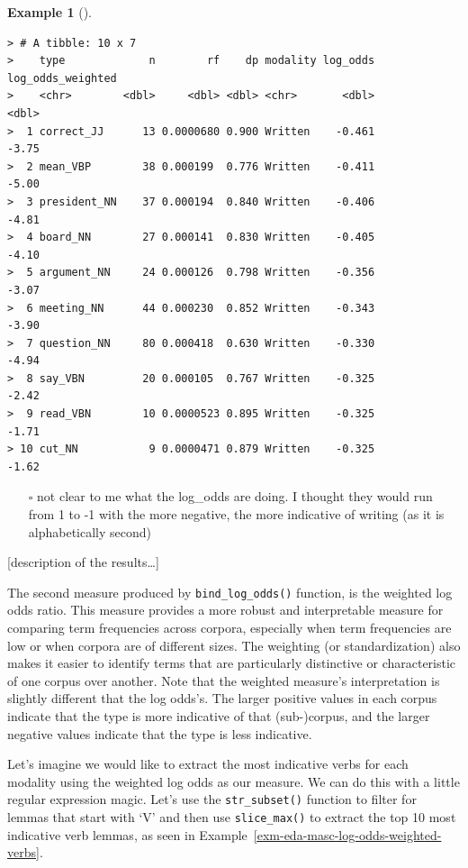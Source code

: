 \documentclass[
  letterpaper,
  DIV=11,
  numbers=noendperiod]{scrreport}
\providecommand{\tightlist}{%
  \setlength{\itemsep}{0pt}\setlength{\parskip}{0pt}}\usepackage{longtable,booktabs,array}
\theoremstyle{definition}
\newtheorem{example}{Example}[chapter]
\theoremstyle{remark}
\begin{document}
\begin{example}[]
\begin{verbatim}
> # A tibble: 10 x 7
>    type             n        rf    dp modality log_odds log_odds_weighted
>    <chr>        <dbl>     <dbl> <dbl> <chr>       <dbl>             <dbl>
>  1 correct_JJ      13 0.0000680 0.900 Written    -0.461             -3.75
>  2 mean_VBP        38 0.000199  0.776 Written    -0.411             -5.00
>  3 president_NN    37 0.000194  0.840 Written    -0.406             -4.81
>  4 board_NN        27 0.000141  0.830 Written    -0.405             -4.10
>  5 argument_NN     24 0.000126  0.798 Written    -0.356             -3.07
>  6 meeting_NN      44 0.000230  0.852 Written    -0.343             -3.90
>  7 question_NN     80 0.000418  0.630 Written    -0.330             -4.94
>  8 say_VBN         20 0.000105  0.767 Written    -0.325             -2.42
>  9 read_VBN        10 0.0000523 0.895 Written    -0.325             -1.71
> 10 cut_NN           9 0.0000471 0.879 Written    -0.325             -1.62
\end{verbatim}

\end{example}

\begin{itemize}
\tightlist
\item[$\square$]
  not clear to me what the log\_odds are doing. I thought they would run
  from 1 to -1 with the more negative, the more indicative of writing
  (as it is alphabetically second)
\end{itemize}

{[}description of the results\ldots{]}

The second measure produced by \texttt{bind\_log\_odds()} function, is
the weighted log odds ratio. This measure provides a more robust and
interpretable measure for comparing term frequencies across corpora,
especially when term frequencies are low or when corpora are of
different sizes. The weighting (or standardization) also makes it easier
to identify terms that are particularly distinctive or characteristic of
one corpus over another. Note that the weighted measure's interpretation
is slightly different that the log odds's. The larger positive values in
each corpus indicate that the type is more indicative of that
(sub-)corpus, and the larger negative values indicate that the type is
less indicative.

Let's imagine we would like to extract the most indicative verbs for
each modality using the weighted log odds as our measure. We can do this
with a little regular expression magic. Let's use the
\texttt{str\_subset()} function to filter for lemmas that start with `V'
and then use \texttt{slice\_max()} to extract the top 10 most indicative
verb lemmas, as seen in
Example~\ref{exm-eda-masc-log-odds-weighted-verbs}.
\end{document}
